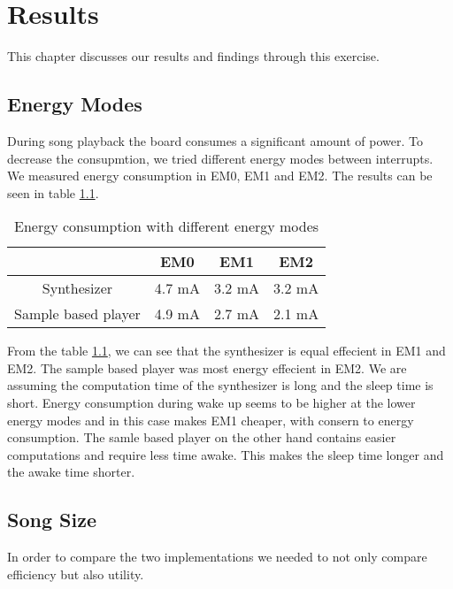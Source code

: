 \chapter{Results}

This chapter discusses our results and findings through this exercise. 


\section{Energy Modes}
\label{sec:energyModeResults}
During song playback the board consumes a significant amount of power. To decrease the consupmtion, we tried different energy modes between interrupts. We measured energy consumption in EM0, EM1 and EM2. The results can be seen in table \ref{tab:benchmarkEnergyModes}.

\begin{table}[H]
	\begin{center}
	\begin{tabular}{ |c|c|c|c| }
	  \hline
	  & EM0 & EM1 & EM2 \\
	  \hline
	  Synthesizer & 4.7 mA & 3.2 mA & 3.2 mA \\
	  \hline
	  Sample based player & 4.9 mA & 2.7 mA & 2.1 mA \\
	  \hline

	\end{tabular}
	\caption{Energy consumption with different energy modes}
	\label{tab:benchmarkEnergyModes}
	\end{center}
\end{table}

From the table \ref{tab:benchmarkEnergyModes}, we can see that the synthesizer is equal effecient in EM1 and EM2. The sample based player was most energy effecient in EM2. We are assuming the computation time of the synthesizer is long and the sleep time is short. Energy consumption during wake up seems to be higher at the lower energy modes and in this case makes EM1 cheaper, with consern to energy consumption. The samle based player on the other hand contains easier computations and require less time awake. This makes the sleep time longer and the awake time shorter.

\section{Song Size}
In order to compare the two implementations we needed to not only compare efficiency but also utility. 


